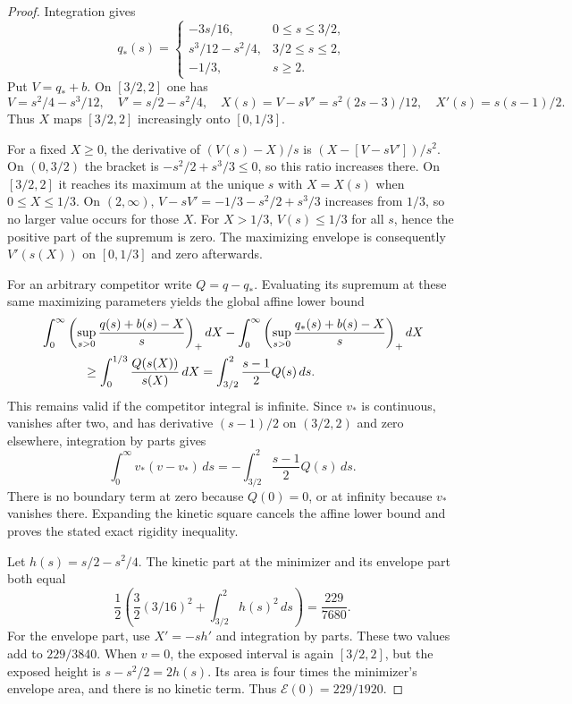 \documentclass[11pt]{article}
\begin{document}
\begin{proof}
Integration gives
\[
 q_*(s)=\begin{cases}
 -3s/16,&0\le s\le3/2,\\
 s^3/12-s^2/4,&3/2\le s\le2,\\
 -1/3,&s\ge2.
 \end{cases}
\]
Put $V=q_*+b$. On $[3/2,2]$ one has
\[
 V=s^2/4-s^3/12,\quad V'=s/2-s^2/4,\quad
 X(s)=V-sV'=s^2(2s-3)/12,\quad X'(s)=s(s-1)/2.
\]
Thus $X$ maps $[3/2,2]$ increasingly onto $[0,1/3]$.

For a fixed $X\ge0$, the derivative of $(V(s)-X)/s$ is $(X-[V-sV'])/s^2$. On $(0,3/2)$ the bracket is $-s^2/2+s^3/3\le0$, so this ratio increases there. On $[3/2,2]$ it reaches its maximum at the unique $s$ with $X=X(s)$ when $0\le X\le1/3$. On $(2,\infty)$, $V-sV'=-1/3-s^2/2+s^3/3$ increases from $1/3$, so no larger value occurs for those $X$. For $X>1/3$, $V(s)\le1/3$ for all $s$, hence the positive part of the supremum is zero. The maximizing envelope is consequently $V'(s(X))$ on $[0,1/3]$ and zero afterwards.

For an arbitrary competitor write $Q=q-q_*$. Evaluating its supremum at these same maximizing parameters yields the global affine lower bound
\begin{align*}
 &\int_0^\infty\left(\sup_{s>0}\frac{q(s)+b(s)-X}{s}\right)_+dX
 -\int_0^\infty\left(\sup_{s>0}\frac{q_*(s)+b(s)-X}{s}\right)_+dX\\
 &\hspace{12mm}\ge\int_0^{1/3}\frac{Q(s(X))}{s(X)}\,dX
 =\int_{3/2}^2\frac{s-1}{2}Q(s)\,ds.
\end{align*}
This remains valid if the competitor integral is infinite. Since $v_*$ is continuous, vanishes after two, and has derivative $(s-1)/2$ on $(3/2,2)$ and zero elsewhere, integration by parts gives
\[
 \int_0^\infty v_*(v-v_*)\,ds=-\int_{3/2}^2\frac{s-1}{2}Q(s)\,ds.
\]
There is no boundary term at zero because $Q(0)=0$, or at infinity because $v_*$ vanishes there. Expanding the kinetic square cancels the affine lower bound and proves the stated exact rigidity inequality.

Let $h(s)=s/2-s^2/4$. The kinetic part at the minimizer and its envelope part both equal
\[
 \frac12\left(\frac32(3/16)^2+\int_{3/2}^2h(s)^2\,ds\right)=\frac{229}{7680}.
\]
For the envelope part, use $X'=-s h'$ and integration by parts. These two values add to $229/3840$. When $v=0$, the exposed interval is again $[3/2,2]$, but the exposed height is $s-s^2/2=2h(s)$. Its area is four times the minimizer's envelope area, and there is no kinetic term. Thus $\mathscr E(0)=229/1920$.
\end{proof}
\end{document}
